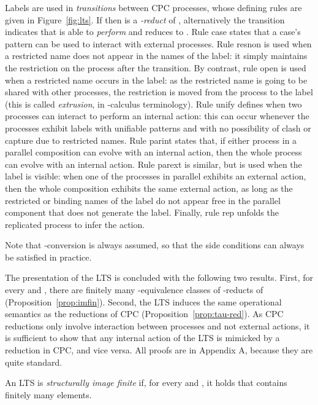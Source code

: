 \documentclass{LMCS}
\begin{document}
Labels are used in {\em transitions}  between CPC
processes, whose defining rules are given in Figure~\ref{fig:lts}. If
 then  is a {\em -reduct} of , alternatively the transition 
indicates that  is able to {\em perform}  and reduces to .
Rule {\sf case} states that a case's pattern can be used to interact with external processes.
Rule {\sf resnon} is used when a restricted name does not appear in the names of the label: it simply maintains the restriction on the process after the transition.
By contrast, rule {\sf open} is used when a restricted name occurs in the label: as the restricted name is going to be shared with other processes, the restriction is moved from the process to the label (this is called {\em extrusion}, in -calculus terminology).
Rule {\sf unify} defines when two processes can interact to perform an internal action:
this can occur whenever the processes exhibit labels with unifiable patterns and with no possibility of clash or capture due to restricted names.
Rule {\sf parint} states that, if either process in a parallel composition can evolve with an internal action, then the whole process can evolve with an internal action.
Rule {\sf parext} is similar, but is used when the label is visible: when one of the processes in parallel exhibits an external action, then the whole composition exhibits the same external action, as long as the restricted or binding names of the label do not appear free in the parallel component that does not generate the label.
Finally, rule {\sf rep} unfolds the replicated process to infer the action. 

Note that -conversion is always assumed, so that the  side conditions can always be satisfied in practice. 

The presentation of the LTS is concluded with the following two
results.  First, for every  and , there are finitely many
-equivalence classes of -reducts of 
(Proposition~\ref{prop:imfin}).  Second, the LTS induces the same
operational semantics as the reductions of CPC
(Proposition~\ref{prop:tau-red}).  As CPC reductions only involve
interaction between processes and not external actions, it is
sufficient to show that any internal action of the LTS is mimicked by
a reduction in CPC, and vice versa. All proofs are in Appendix A, because they are quite standard.

\begin{defi}
An LTS is {\em structurally image finite} if, for every  and , it holds that
 contains finitely many elements.
\end{defi}
\end{document}
